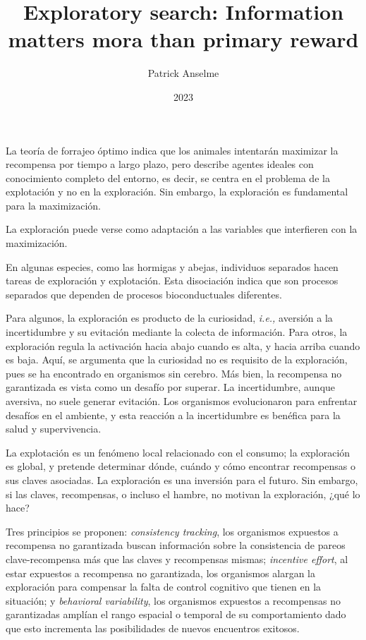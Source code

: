 \documentclass[a4paper,12pt]{article}
\title{Exploratory search: Information matters mora than primary reward}
\author{Patrick Anselme}
\date{2023}
\begin{document}
{\scshape\bfseries \maketitle}

La teoría de forrajeo óptimo indica que los animales intentarán maximizar la recompensa por tiempo a largo plazo, pero describe agentes ideales con conocimiento completo del entorno, es decir, se centra en el problema de la explotación y no en la exploración.
Sin embargo, la exploración es fundamental para la maximización.

La exploración puede verse como adaptación a las variables que interfieren con la maximización.

En algunas especies, como las hormigas y abejas, individuos separados hacen tareas de exploración y explotación.
Esta disociación indica que son procesos separados que dependen de procesos bioconductuales diferentes.

Para algunos, la exploración es producto de la curiosidad, {\itshape i.e.,} aversión a la incertidumbre y su evitación mediante la colecta de información.
Para otros, la exploración regula la activación hacia abajo cuando es alta, y hacia arriba cuando es baja.
Aquí, se argumenta que la curiosidad no es requisito de la exploración, pues se ha encontrado en organismos sin cerebro.
Más bien, la recompensa no garantizada es vista como un desafío por superar.
La incertidumbre, aunque aversiva, no suele generar evitación.
Los organismos evolucionaron para enfrentar desafíos en el ambiente, y esta reacción a la incertidumbre es benéfica para la salud y supervivencia.

La explotación es un fenómeno local relacionado con el consumo; la exploración es global, y pretende determinar dónde, cuándo y cómo encontrar recompensas o sus claves asociadas.
La exploración es una inversión para el futuro.
Sin embargo, si las claves, recompensas, o incluso el hambre, no motivan la exploración, ¿qué lo hace?

Tres principios se proponen: {\itshape consistency tracking}, los organismos expuestos a recompensa no garantizada buscan información sobre la consistencia de pareos clave-recompensa más que las claves y recompensas mismas; {\itshape incentive effort}, al estar expuestos a recompensa no garantizada, los organismos alargan la exploración para compensar la falta de control cognitivo que tienen en la situación; y {\itshape behavioral variability}, los organismos expuestos a recompensas no garantizadas amplían el rango espacial o temporal de su comportamiento dado que esto incrementa las posibilidades de nuevos encuentros exitosos.
\end{document}
